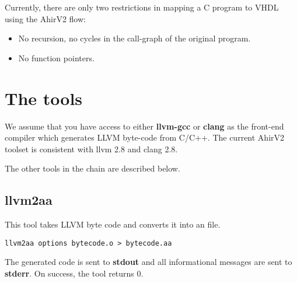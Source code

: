 Currently, there are only two restrictions in mapping
a C program to VHDL using the AhirV2 flow:
\begin{itemize}
\item No recursion, no cycles in the call-graph of the original
program.
\item No function pointers.
\end{itemize}

\section{The tools}

We assume that you have access to either {\bf llvm-gcc}
or {\bf clang} as the front-end compiler which generates
LLVM byte-code from C/C++.  The current AhirV2 toolset
is consistent with llvm 2.8 and clang 2.8.

The other tools in the chain are described below.

\subsection{{\bf llvm2aa}}

This tool takes LLVM byte code and converts it into an
\Aa file.
\begin{verbatim}
llvm2aa options bytecode.o > bytecode.aa
\end{verbatim}
The generated \Aa code is sent to {\bf stdout} and all informational
messages are sent to {\bf stderr}.  On success, the tool returns 0.

